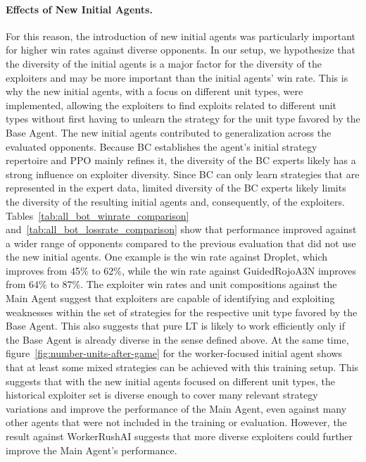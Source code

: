 \documentclass[10pt,twocolumn,letterpaper]{article}
\begin{document}
\paragraph{Effects of New Initial Agents.}
For this reason, the introduction of new initial agents was particularly important for higher win rates against diverse opponents.
In our setup, we hypothesize that the diversity of the initial agents is a major factor for the diversity of the exploiters and may be more important than the initial agents' win rate.
This is why the new initial agents, with a focus on different unit types, were implemented, allowing the exploiters to find exploits related to different unit types without first having to unlearn the strategy for the unit type favored by the Base Agent.
The new initial agents contributed to generalization across the evaluated opponents.
Because BC establishes the agent’s initial strategy repertoire and PPO mainly refines it, the diversity of the BC experts likely has a strong influence on exploiter diversity.
Since BC can only learn strategies that are represented in the expert data, limited diversity of the BC experts likely limits the diversity of the resulting initial agents and, consequently, of the exploiters.
Tables~\ref{tab:all_bot_winrate_comparison} and~\ref{tab:all_bot_lossrate_comparison} show that performance improved against a wider range of opponents compared to the previous evaluation that did not use the new initial agents.
One example is the win rate against Droplet, which improves from 45\% to 62\%, while the win rate against GuidedRojoA3N improves from 64\% to 87\%.
\break\break
The exploiter win rates and unit compositions against the Main Agent suggest that exploiters are capable of identifying and exploiting weaknesses within the set of strategies for the respective unit type favored by the Base Agent.
This also suggests that pure LT is likely to work efficiently only if the Base Agent is already diverse in the sense defined above.
At the same time, figure~\ref{fig:number-units-after-game} for the worker-focused initial agent shows that at least some mixed strategies can be achieved with this training setup.
This suggests that with the new initial agents focused on different unit types, the historical exploiter set is diverse enough to cover many relevant strategy variations and improve the performance of the Main Agent, even against many other agents that were not included in the training or evaluation.
However, the result against WorkerRushAI suggests that more diverse exploiters could further improve the Main Agent's performance.
\end{document}
